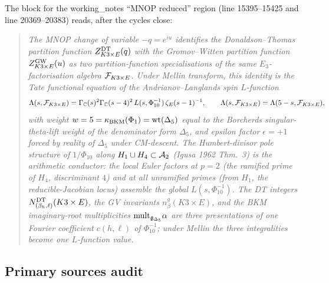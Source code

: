 The block for the working\_notes ``MNOP reduced'' region (line
15395--15425 and line 20369--20383) reads, after the cycles close:

\medskip
\begin{quote}
\emph{The MNOP change of variable $-q=e^{iu}$ identifies the
Donaldson--Thomas partition function
$Z^{\mathrm{DT}}_{K3\times E}(q)$ with the Gromov--Witten partition
function $Z^{\mathrm{GW}}_{K3\times E}(u)$ as two partition-function
specialisations of the same $E_3$-factorisation algebra
$\mathcal{F}_{K3\times E}$. Under Mellin transform, this identity is the
Tate functional equation of the Andrianov--Langlands spin
$L$-function
\[
\Lambda(s,\mathcal{F}_{K3\times E})
=\Gamma_{\mathbb{C}}(s)^2\Gamma_{\mathbb{C}}(s-4)^2\,L(s,\Phi_{10}^{-1})\,\zeta_E(s-1)^{-1},
\qquad
\Lambda(s,\mathcal{F}_{K3\times E})=\Lambda(5-s,\mathcal{F}_{K3\times E}),
\]
with weight $w=5=\kappa_{\mathrm{BKM}}(\Phi_1)=\mathrm{wt}(\Delta_5)$ equal to the
Borcherds singular-theta-lift weight of the denominator form
$\Delta_5$, and epsilon factor $\epsilon=+1$ forced by reality
of $\Delta_5$ under CM-descent. The Humbert-divisor pole
structure of $1/\Phi_{10}$ along $H_1\cup H_4\subset\mathcal{A}_2$
(Igusa 1962 Thm.\ 3) is the arithmetic conductor: the local
Euler factors at $p=2$ (the ramified prime of $H_4$, discriminant
$4$) and at all unramified primes (from $H_1$, the
reducible-Jacobian locus) assemble the global
$L(s,\Phi_{10}^{-1})$. The DT integers
$N^{\mathrm{DT}}_{(\beta_h,\ell)}(K3\times E)$, the GV invariants
$n^g_\beta(K3\times E)$, and the BKM imaginary-root multiplicities
$\mathrm{mult}_{\mathfrak{g}_{\Delta_5}}\alpha$ are three presentations of one
Fourier coefficient $c(h,\ell)$ of $\Phi_{10}^{-1}$; under Mellin
the three integralities become one $L$-function value.}
\end{quote}

\subsection*{Primary sources audit}

